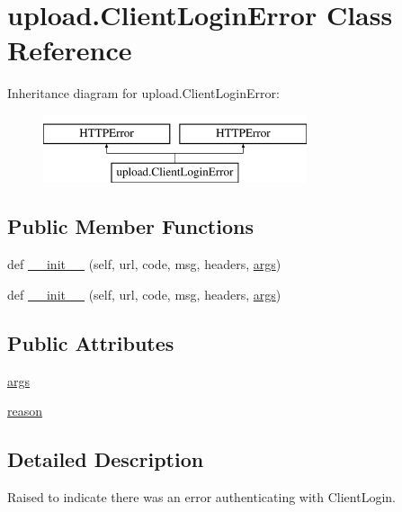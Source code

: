 \hypertarget{classupload_1_1ClientLoginError}{}\section{upload.\+Client\+Login\+Error Class Reference}
\label{classupload_1_1ClientLoginError}
Inheritance diagram for upload.\+Client\+Login\+Error\+:\begin{figure}[H]
\begin{center}
\leavevmode
\includegraphics[height=2.000000cm]{classupload_1_1ClientLoginError}
\end{center}
\end{figure}
\subsection*{Public Member Functions}
\begin{DoxyCompactItemize}
\item 
def \mbox{\hyperlink{classupload_1_1ClientLoginError_a1e590616c2976d881e155958cedbbe47}{\+\_\+\+\_\+init\+\_\+\+\_\+}} (self, url, code, msg, headers, \mbox{\hyperlink{classupload_1_1ClientLoginError_ac300a0b034b2bc64cedc51e09fb6d663}{args}})
\item 
def \mbox{\hyperlink{classupload_1_1ClientLoginError_a1e590616c2976d881e155958cedbbe47}{\+\_\+\+\_\+init\+\_\+\+\_\+}} (self, url, code, msg, headers, \mbox{\hyperlink{classupload_1_1ClientLoginError_ac300a0b034b2bc64cedc51e09fb6d663}{args}})
\end{DoxyCompactItemize}
\subsection*{Public Attributes}
\begin{DoxyCompactItemize}
\item 
\mbox{\hyperlink{classupload_1_1ClientLoginError_ac300a0b034b2bc64cedc51e09fb6d663}{args}}
\item 
\mbox{\hyperlink{classupload_1_1ClientLoginError_ae0555feb182d89d1e4d7944afbfe14e5}{reason}}
\end{DoxyCompactItemize}


\subsection{Detailed Description}
\begin{DoxyVerb}Raised to indicate there was an error authenticating with ClientLogin.\end{DoxyVerb}
 

